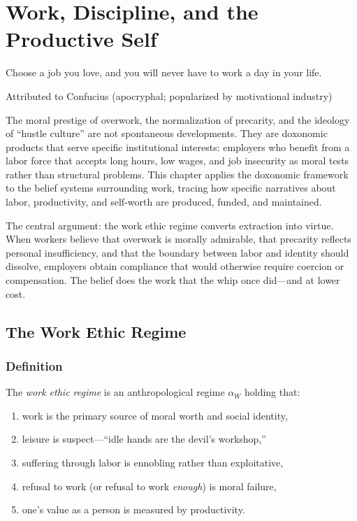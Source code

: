 \chapter{Work, Discipline, and the Productive Self}
\label{ch:work-discipline}

\epigraph{Choose a job you love, and you will never have to work a day in your life.}{Attributed to Confucius (apocryphal; popularized by motivational industry)}

\noindent
The moral prestige of overwork, the normalization of precarity, and the ideology of ``hustle culture'' are not spontaneous developments.
They are doxonomic products that serve specific institutional interests: employers who benefit from a labor force that accepts long hours, low wages, and job insecurity as moral tests rather than structural problems.
This chapter applies the doxonomic framework to the belief systems surrounding work, tracing how specific narratives about labor, productivity, and self-worth are produced, funded, and maintained.

The central argument: the work ethic regime converts extraction into virtue.
When workers believe that overwork is morally admirable, that precarity reflects personal insufficiency, and that the boundary between labor and identity should dissolve, employers obtain compliance that would otherwise require coercion or compensation.
The belief does the work that the whip once did---and at lower cost.

\section{The Work Ethic Regime}
\label{sec:ch26-overwork}

\subsection{Definition}

\begin{definition}
\label{def:work-ethic}
The \emph{work ethic regime} is an anthropological regime $\alpha_W$ holding that:
\begin{enumerate}[nosep]
  \item work is the primary source of moral worth and social identity,
  \item leisure is suspect---``idle hands are the devil's workshop,''
  \item suffering through labor is ennobling rather than exploitative,
  \item refusal to work (or refusal to work \emph{enough}) is moral failure,
  \item one's value as a person is measured by productivity.
\end{enumerate}
\end{definition}

